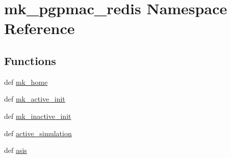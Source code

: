 \hypertarget{namespacemk__pgpmac__redis}{\section{mk\-\_\-pgpmac\-\_\-redis Namespace Reference}
\label{namespacemk__pgpmac__redis}
}
\subsection*{Functions}
\begin{DoxyCompactItemize}
\item 
def \hyperlink{namespacemk__pgpmac__redis_ae9b221a54b2fec9e5e3ed2e3c608b39f}{mk\-\_\-home}
\item 
def \hyperlink{namespacemk__pgpmac__redis_a3d3677b3f12b868f4d4a0c0f122e7179}{mk\-\_\-active\-\_\-init}
\item 
def \hyperlink{namespacemk__pgpmac__redis_ac69e5c50c2f30dc7956173aa0e40ae74}{mk\-\_\-inactive\-\_\-init}
\item 
def \hyperlink{namespacemk__pgpmac__redis_a2572732af48007dc8f70e12ed2a738fe}{active\-\_\-simulation}
\item 
def \hyperlink{namespacemk__pgpmac__redis_afe77e7198e6992a85f09dc3667d931d7}{asis}
\end{DoxyCompactItemize}
